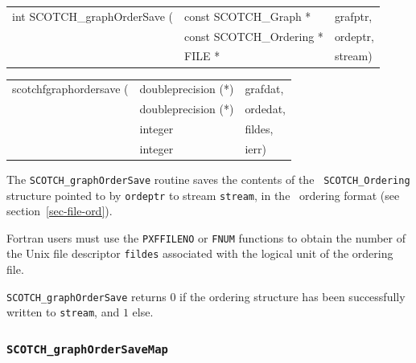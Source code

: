 \begin{itemize}
\progsyn

{\tt\begin{tabular}{l@{}ll}
int SCOTCH\_graphOrderSave ( & const SCOTCH\_Graph *    & grafptr, \\
                             & const SCOTCH\_Ordering * & ordeptr, \\
                             & FILE *                   & stream)
\end{tabular}}

{\tt\begin{tabular}{l@{}ll}
scotchfgraphordersave ( & doubleprecision (*) & grafdat, \\
                        & doubleprecision (*) & ordedat, \\
                        & integer             & fildes,  \\
                        & integer             & ierr)
\end{tabular}}

\progdes

The {\tt SCOTCH\_graphOrderSave} routine saves the contents of the {\tt
SCOTCH\_\lbt Ordering} structure pointed to by {\tt ordeptr} to stream
{\tt stream}, in the \scotch\ ordering format (see
section~\ref{sec-file-ord}).

Fortran users must use the {\tt PXFFILENO} or {\tt FNUM} functions to
obtain the number of the Unix file descriptor {\tt fildes} associated
with the logical unit of the ordering file.

\progret

{\tt SCOTCH\_graphOrderSave} returns $0$ if the ordering structure
has been successfully written to {\tt stream}, and $1$ else.
\end{itemize}

\subsubsection{{\tt SCOTCH\_graphOrderSaveMap}}

